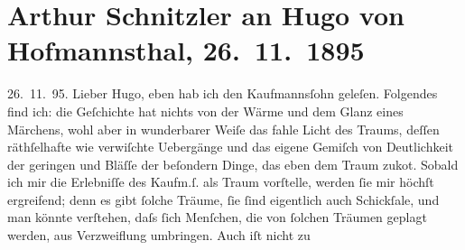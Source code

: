

         
         \renewcommand{\erwaehntePersonen}{Personen: Hugo von Hofmannsthal}
         \renewcommand{\erwaehnteOrte}{Orte: Wien}
         \renewcommand{\erwaehnteWerke}{Werke: Das Märchen der 672. Nacht}
               \section[Arthur Schnitzler an Hugo von Hofmannsthal, 26. 11. 1895]{ Arthur Schnitzler an Hugo von Hofmannsthal, 26. 11. 1895}\nopagebreak{}\rehead{ }\begin{ledgroupsized}[t]{13cm}\normalsize\beginnumbering \toendnotes[C]{\smallbreak\pagebreak[2]} 
\toendnotes[C]{\smallbreak}\pstart
           \raggedleft{}{\pb}26. 11. 95.\pend
           \pstart
           Lieber Hugo, eben hab ich den Kaufmannsſohn geleſen. Folgendes find ich: die Geſchichte hat nichts von der
               Wärme und dem Glanz eines Märchens, wohl aber in wunderbarer Weiſe das fahle Licht
               des Traums, deſſen räthſelhafte wie verwiſchte Uebergänge und das eigene Gemiſch von
               Deutlichkeit der geringen und Bläſſe der beſondern Dinge, das eben dem Traum zuko{\geminationm}t. Sobald ich mir die Erlebniſſe des Kaufm.ſ. als Traum vorſtelle, werden ſie mir
               höchſt ergreifend; denn es gibt ſolche Träume, ſie ſind eigentlich auch Schickſale,
               und man könnte verſtehen, daſs ſich Menſchen, die von ſolchen Träumen geplagt {\pb}werden, aus Verzweiflung umbringen. Auch iſt nicht zu

\end{ledgroupsized}
